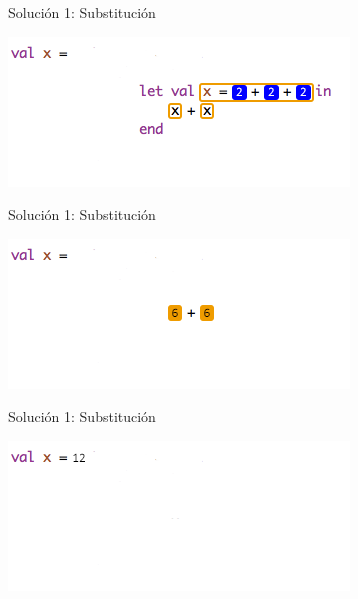 \documentclass{beamer} %
\begin{document}
\begin{frame}{Solución 1: Substitución}
    \begin{center}
        \includegraphics[width=.9\textwidth]{./image/cap5/scope04}
    \end{center}
\end{frame}

\begin{frame}{Solución 1: Substitución}
    \begin{center}
        \includegraphics[width=.9\textwidth]{./image/cap5/scope05}
    \end{center}
\end{frame}

\begin{frame}{Solución 1: Substitución}
    \begin{center}
        \includegraphics[width=.9\textwidth]{./image/cap5/scope06}
    \end{center}
\end{frame}
\end{document}
